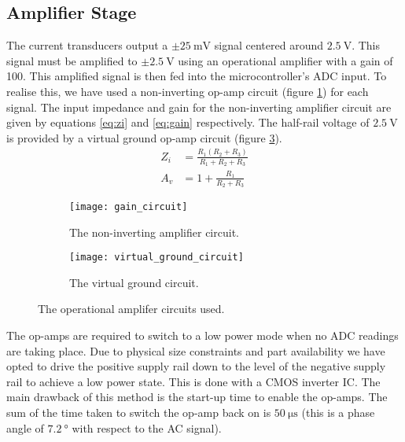 \subsection{Amplifier Stage}

The current transducers output a $\pm \SI{25}{\milli\volt}$ signal centered around $\SI{2.5}{\volt}$.
This signal must be amplified to $\pm \SI{2.5}{\volt}$ using an operational amplifier with a gain of 100.
This amplified signal is then fed into the microcontroller's ADC input.
To realise this, we have used a non-inverting op-amp circuit (figure \ref{fig:non-inverting-op-amp}) for each signal.
The input impedance and gain for the non-inverting amplifier circuit are given by equations \ref{eq:zi} and \ref{eq:gain} respectively.
The half-rail voltage of $\SI{2.5}{\volt}$ is provided by a virtual ground op-amp circuit (figure \ref{fig:half-supply}).
\begin{align}
	Z_i &= \frac{R_1 (R_2 + R_3)}{R_1 + R_2 + R_3} \label{eq:zi} \\
	A_v &= 1 + \frac{R_1}{R_2 + R_3}\label{eq:gain}
\end{align}

\begin{figure}[ht]
\centering

\begin{subfigure}[c]{0.45\textwidth}
	\centering
	\texttt{[image: gain\_circuit]}
	\caption{The non-inverting amplifier circuit.}
	\label{fig:non-inverting-op-amp}
\end{subfigure}
\hfill
\begin{subfigure}[c]{0.45\textwidth}
	\centering
	\vfill
	\texttt{[image: virtual\_ground\_circuit]}
	\vfill
	\caption{The virtual ground circuit.}
	\label{fig:half-supply}
\end{subfigure}

\caption{The operational amplifer circuits used.}
\end{figure}

The op-amps are required to switch to a low power mode when no ADC readings are taking place.
Due to physical size constraints and part availability we have opted to drive the positive supply rail down to the level of the negative supply rail to achieve a low power state.
This is done with a CMOS inverter IC.
The main drawback of this method is the start-up time to enable the op-amps.
The sum of the time taken to switch the op-amp back on is $\SI{50}{\micro\second}$ (this is a phase angle of $\SI{7.2}{\degree}$ with respect to the AC signal).

